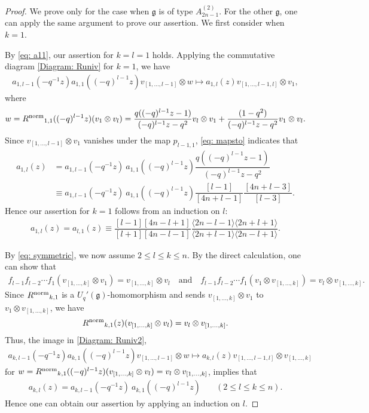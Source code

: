 \documentclass[11pt, leqno]{amsart}
\theoremstyle{definition}
\numberwithin{equation}{section}
\begin{document}
\begin{proof}
We prove only for the case when ${\mathfrak g}$ is of type $A^{(2)}_{2n-1}$. For the other ${\mathfrak g}$, one can apply the same argument
to prove our assertion. We first consider when $k=1$.

By \eqref{eq: a11}, our assertion for $k=l=1$ holds. Applying the commutative diagram \eqref{Diagram: Runiv} for $k=1$,
we have
\begin{align} \label{eq: mapsto}
a_{1,l-1}(-q^{-1}z) a_{1,1}((-q)^{l-1}z)v_{[1,\ldots, l-1]} \otimes w \longmapsto  a_{1,l}(z) v_{[1,\ldots, l-1,l]} \otimes v_1,
\end{align}
where $$w={R^{\rm{norm}}}_{1,1}((-q)^{l-1}z)( v_1 \otimes v_{l})
 =  \dfrac{q((-q)^{l-1}z -1 )}{(-q)^{l-1}z -q^2}v_{l} \otimes v_1 +
\dfrac{(1 -q^2 )}{(-q)^{l-1}z -q^2} v_{1} \otimes v_l.$$
Since $v_{[1,\ldots,l-1]} \otimes v_1$ vanishes under the map $p_{l-1,1}$, \eqref{eq: mapsto} indicates that
\begin{align*}
a_{1,l}(z) &= a_{1,l-1}(-q^{-1}z) \ a_{1,1}((-q)^{l-1}z)
 \dfrac{q((-q)^{l-1}z -1 )}{(-q)^{l-1}z -q^2} \\%
&\equiv a_{1,l-1}(-q^{-1}z) \ a_{1,1}((-q)^{l-1}z)
\dfrac{[l-1]}{[4n+l-1]}\dfrac{[4n+l-3]}{[l-3]}.
\end{align*}
Hence our assertion for $k=1$ follows from an induction on $l$:
\begin{align} \label{eq:a1k A}
  a_{1,l}(z)= a_{l,1}(z) \equiv\dfrac{[l-1][4n-l+1]}{[l+1][4n-l-1]}
  \dfrac{\langle 2n-l-1 \rangle \langle 2n+l+1 \rangle}{\langle 2n+l-1 \rangle \langle 2n-l+1 \rangle }.
\end{align}

By \eqref{eq: symmetric}, we now assume $2 \le l \le k \le n$. By the direct calculation, one can show that
\begin{align*}
f_{l-1} f_{l-2} \cdots f_1 (v_{[1,\dots,k]} \otimes v_1) =   v_{[1,\dots,k]} \otimes v_l \quad\text{and}\quad
f_{l-1} f_{l-2} \cdots f_1 (v_1 \otimes v_{[1,\dots,k]} ) =  v_l \otimes  v_{[1,\dots,k]}.
\end{align*}
Since ${R^{\rm{norm}}}_{k,1}$ is a ${U_q'({\mathfrak g})}$-homomorphism and sends $v_{[1,\ldots,k]} \otimes v_1$ to $v_1 \otimes v_{[1,\ldots,k]}$, we have
$${R^{\rm{norm}}}_{k,1}(z)(v_{[1,\ldots,k]} \otimes v_l) =  v_l \otimes  v_{[1,\dots,k]}.$$
Thus, the image in \eqref{Diagram: Runiv2},
\begin{align*}
a_{k,l-1}(-q^{-1}z) a_{k,1}((-q)^{l-1}z)v_{[1,\ldots, l-1]} \otimes w \longmapsto a_{k,l}(z) v_{[1,\ldots, l-1,l]} \otimes v_{[1,\ldots,k]}
\end{align*}
for $w={R^{\rm{norm}}}_{k,1}((-q)^{l-1}z)( v_{[1,\dots,k]} \otimes v_l ) =  v_l \otimes  v_{[1,\dots,k]}$, implies that
\begin{align} \label{eq:recursive akl A}
a_{k,l}(z) = a_{k,l-1}(-q^{-1}z) \ a_{k,1}((-q)^{l-1}z) &\quad (2
\leq l \le k \le n).
\end{align}
Hence one can obtain our assertion by applying an induction on $l$.
\end{proof}
\end{document}
